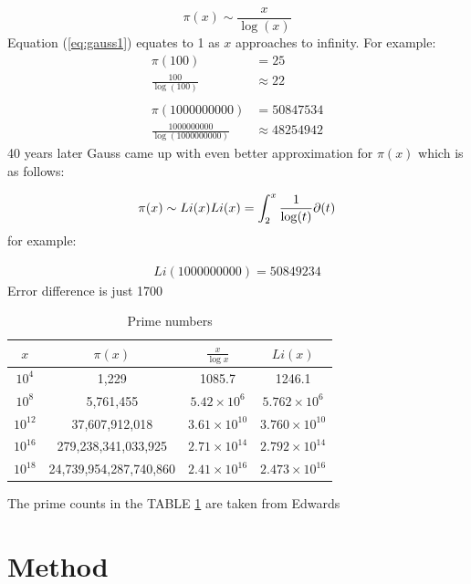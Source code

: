 \documentclass[12pt,journal,compsoc]{IEEEtran}
\begin{document}
	\begin{equation}
		\pi(x)\sim \frac{x}{\log(x)}
	\end{equation}
Equation (\ref{eq:gauss1}) equates to 1 as $x$ approaches to infinity. For example: 
	\begin{align*}
			\pi(100) &= 25 \\
			\frac{100}{\log(100)} &\approx 22 \\\\
			\pi(1000000000) &= 50847534 \\
			\frac{1000000000}{\log(1000000000)} &\approx 48254942
		\end{align*}
40 years later Gauss came up with even better approximation for $\pi(x)$ which is as follows:

	\begin{equation}
		\pi(x) \sim Li(x)\\
		Li(x)=\int_2^x\frac{1}{\log(t)}\partial(t)
	\end{equation}
for example:

\begin{align*}
		Li(1000000000) = 50849234
	\end{align*}
Error difference is just 1700

\begin{table}[ht]
	\begin{center}
	\begin{tabular}{|c|c|c|c|}
    	\hline
       		$x$	&		$\pi(x)$					&	$\frac{x}{\log x}$		&	$Li(x)$\\
	\hline
    		$10^{4}$	&	1,229					&	1085.7				&	1246.1	\\
		$10^{8}$	&	5,761,455					&	$5.42 \times 10^6$		&	$5.762 \times 10^6$	\\
		$10^{12}$	&	37,607,912,018				&	$3.61 \times 10^10$		&	$3.760  \times 10^{10}$		\\
		$10^{16}$	&	279,238,341,033,925		&	$2.71 \times 10^14$		&	$2.792 \times 10^{14}$	\\
		$10^{18}$	&	24,739,954,287,740,860		&	$2.41 \times 10^16$		&	$2.473 \times 10^{16}$	\\
	\hline
	\end{tabular}
	\end{center}
	\caption{Prime numbers}
	\label{table:gauss_values}

\end{table}
The prime counts in the TABLE \ref{table:gauss_values} are taken from Edwards\cite{zeta_values}

\section{{Method}}
\end{document}
